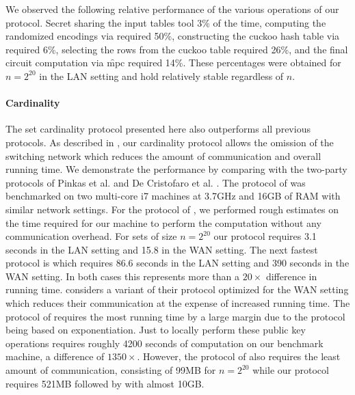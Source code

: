 We observed the following relative performance of the various operations of our protocol. Secret sharing the input tables tool 3\% of the time, computing the randomized encodings via  required 50\%, constructing the cuckoo hash table via  required 6\%, selecting the rows from the cuckoo table required 26\%, and the final circuit computation via \f{mpc} required 14\%. These percentages were obtained for $n=2^{20}$ in the LAN setting and hold relatively stable regardless of $n$.



\paragraph{Cardinality} The set cardinality protocol presented here also outperforms all previous protocols. As described in , our cardinality protocol allows the omission of the switching network which reduces the amount of communication and overall running time. We demonstrate the performance by comparing with the two-party protocols of Pinkas et al. \cite{PSWW18} and De Cristofaro et al. \cite{DBLP:conf/cans/CristofaroGT12}. The protocol of  \cite{PSWW18} was benchmarked on two multi-core i7 machines at 3.7GHz and 16GB of RAM with similar network settings. For the protocol of \cite{DBLP:conf/cans/CristofaroGT12}, we performed rough estimates on the time required for our machine to perform the computation without any communication overhead. For sets of size $n=2^{20}$ our protocol requires 3.1 seconds in the LAN setting and 15.8 in the WAN setting. The next fastest protocol is \cite{PSWW18} which requires 86.6 seconds in the LAN setting and 390 seconds in the WAN setting. In both cases this represents more than a $20\times$ difference in running time.  \cite{PSWW18} considers a variant of their protocol optimized for the WAN setting which reduces their communication at the expense of increased running time. The protocol of \cite{DBLP:conf/cans/CristofaroGT12} requires the most running time by a large margin due to the protocol being based on exponentiation. Just to locally perform these public key operations requires roughly 4200 seconds of computation on our benchmark machine, a difference of $1350\times$. However, the protocol of \cite{DBLP:conf/cans/CristofaroGT12} also requires the least amount of communication, consisting of 99MB for $n=2^{20}$ while our protocol requires 521MB followed by \cite{PSWW18}  with almost 10GB.

